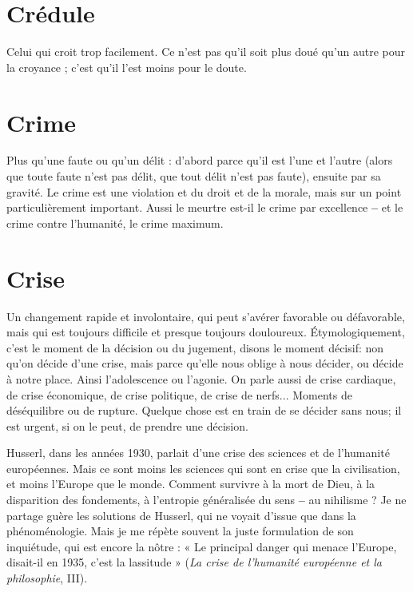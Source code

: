 \section{Crédule}
Celui qui croit trop facilement. Ce n’est pas qu’il soit plus doué
qu’un autre pour la croyance ; c’est qu’il l’est moins pour le
doute.

\section{Crime}
Plus qu’une faute ou qu’un délit : d’abord parce qu’il est l’une et
l’autre (alors que toute faute n’est pas délit, que tout délit n’est pas
faute), ensuite par sa gravité. Le crime est une violation et du droit et de la
morale, mais sur un point particulièrement important. Aussi le meurtre est-il le
crime par excellence {\bf --} et le crime contre l’humanité, le crime maximum.

\section{Crise}
Un changement rapide et involontaire, qui peut s’avérer favorable
ou défavorable, mais qui est toujours difficile et presque toujours
douloureux. Étymologiquement, c’est le moment de la décision ou du jugement,
disons le moment décisif: non qu’on décide d’une crise, mais parce
qu’elle nous oblige à nous décider, ou décide à notre place. Ainsi l'adolescence
ou l’agonie. On parle aussi de crise cardiaque, de crise économique, de crise
politique, de crise de nerfs... Moments de déséquilibre ou de rupture. Quelque
chose est en train de se décider sans nous; il est urgent, si on le peut, de
prendre une décision.

Husserl, dans les années 1930, parlait d’une crise des sciences et de l’humanité
européennes. Mais ce sont moins les sciences qui sont en crise que la civilisation,
et moins l’Europe que le monde. Comment survivre à la mort de
Dieu, à la disparition des fondements, à l’entropie généralisée du sens {\bf --} au
nihilisme ? Je ne partage guère les solutions de Husserl, qui ne voyait d’issue
que dans la phénoménologie. Mais je me répète souvent la juste formulation de
son inquiétude, qui est encore la nôtre : « Le principal danger qui menace
l’Europe, disait-il en 1935, c’est la lassitude » ({\it }{\it La crise de l'humanité européenne
et la philosophie}, III).

